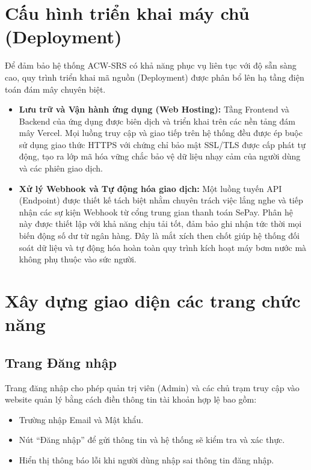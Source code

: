 \documentclass[../main.tex]{subfiles}
\begin{document}
\section{Cấu hình triển khai máy chủ (Deployment)}

Để đảm bảo hệ thống ACW-SRS có khả năng phục vụ liên tục với độ sẵn sàng cao, quy trình triển khai mã nguồn (Deployment) được phân bổ lên hạ tầng điện toán đám mây chuyên biệt.

\begin{itemize}
    \item \textbf{Lưu trữ và Vận hành ứng dụng (Web Hosting):} Tầng Frontend và Backend của ứng dụng được biên dịch và triển khai trên các nền tảng đám mây Vercel. Mọi luồng truy cập và giao tiếp trên hệ thống đều được ép buộc sử dụng giao thức HTTPS với chứng chỉ bảo mật SSL/TLS được cấp phát tự động, tạo ra lớp mã hóa vững chắc bảo vệ dữ liệu nhạy cảm của người dùng và các phiên giao dịch.
    \item \textbf{Xử lý Webhook và Tự động hóa giao dịch:} Một luồng tuyến API (Endpoint) được thiết kế tách biệt nhằm chuyên trách việc lắng nghe và tiếp nhận các sự kiện Webhook từ cổng trung gian thanh toán SePay. Phân hệ này được thiết lập với khả năng chịu tải tốt, đảm bảo ghi nhận tức thời mọi biến động số dư từ ngân hàng. Đây là mắt xích then chốt giúp hệ thống đối soát dữ liệu và tự động hóa hoàn toàn quy trình kích hoạt máy bơm nước mà không phụ thuộc vào sức người.
\end{itemize}

\section{Xây dựng giao diện các trang chức năng}

\subsection{Trang Đăng nhập}

Trang đăng nhập cho phép quản trị viên (Admin) và các chủ trạm truy cập vào website quản lý bằng cách điền thông tin tài khoản hợp lệ bao gồm:
\begin{itemize}
    \item Trường nhập Email và Mật khẩu.
    \item Nút ``Đăng nhập'' để gửi thông tin và hệ thống sẽ kiểm tra và xác thực.
    \item Hiển thị thông báo lỗi khi người dùng nhập sai thông tin đăng nhập.
\end{itemize}
\end{document}
